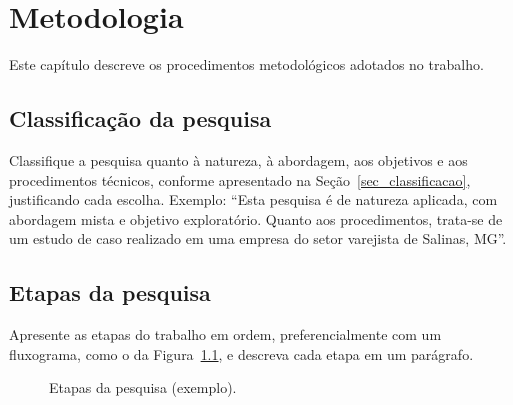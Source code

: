 \chapter{Metodologia}
\label{cap3_metodologia}


Este capítulo descreve os procedimentos metodológicos adotados no trabalho.

\section{Classificação da pesquisa}
\label{sec_met_classificacao}

Classifique a pesquisa quanto à natureza, à abordagem, aos objetivos e aos procedimentos técnicos, conforme apresentado na Seção~\ref{sec_classificacao}, justificando cada escolha. Exemplo: \enquote{Esta pesquisa é de natureza aplicada, com abordagem mista e objetivo exploratório. Quanto aos procedimentos, trata-se de um estudo de caso realizado em uma empresa do setor varejista de Salinas, MG}.

\section{Etapas da pesquisa}
\label{sec_met_etapas}

Apresente as etapas do trabalho em ordem, preferencialmente com um fluxograma, como o da Figura~\ref{fig_etapas}, e descreva cada etapa em um parágrafo.

\begin{figure}[htb]
	\centering
	\caption{Etapas da pesquisa (exemplo).}
	\label{fig_etapas}
\end{figure}

